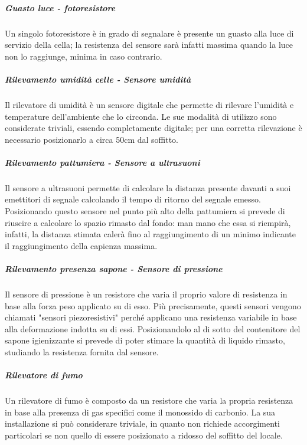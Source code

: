 \documentclass[12pt]{article}
\begin{document}
\subparagraph{Guasto luce - fotoresistore}
Un singolo fotoresistore è in grado di segnalare è presente un guasto alla luce di servizio della cella; la resistenza del sensore sarà infatti massima quando la luce non lo raggiunge, minima in caso contrario.

\subparagraph{Rilevamento umidità celle - Sensore umidità}
Il rilevatore di umidità è un sensore digitale che permette di rilevare l'umidità e temperature dell'ambiente che lo circonda. 
Le sue modalità di utilizzo sono considerate triviali, essendo completamente digitale; per una corretta rilevazione è necessario posizionarlo a circa 50cm dal soffitto.
\subparagraph{Rilevamento pattumiera - Sensore a ultrasuoni}
Il sensore a ultrasuoni permette di calcolare la distanza presente davanti a suoi emettitori di segnale calcolando il tempo di ritorno del segnale emesso.
Posizionando questo sensore nel punto più alto della pattumiera si prevede di riuscire a calcolare lo spazio rimasto dal fondo: man mano che essa si riempirà, infatti, la distanza stimata calerà fino al raggiungimento di un minimo indicante il raggiungimento della capienza massima.
\subparagraph{Rilevamento presenza sapone - Sensore di pressione}
Il sensore di pressione è un resistore che varia il proprio valore di resistenza in base alla forza peso applicato su di esso.
 Più precisamente, questi sensori vengono chiamati "sensori piezoresistivi" perché applicano una resistenza variabile in base alla deformazione indotta su di essi.
Posizionandolo al di sotto del contenitore del sapone igienizzante si prevede di poter stimare la quantità di liquido rimasto, studiando la resistenza fornita dal sensore.
\subparagraph{Rilevatore di fumo}
Un rilevatore di fumo è composto da un resistore che varia la propria resistenza in base alla presenza di gas specifici come il monossido di carbonio. La sua installazione si può considerare triviale, in quanto non richiede accorgimenti particolari se non quello di essere posizionato a ridosso del soffitto del locale.
\end{document}
